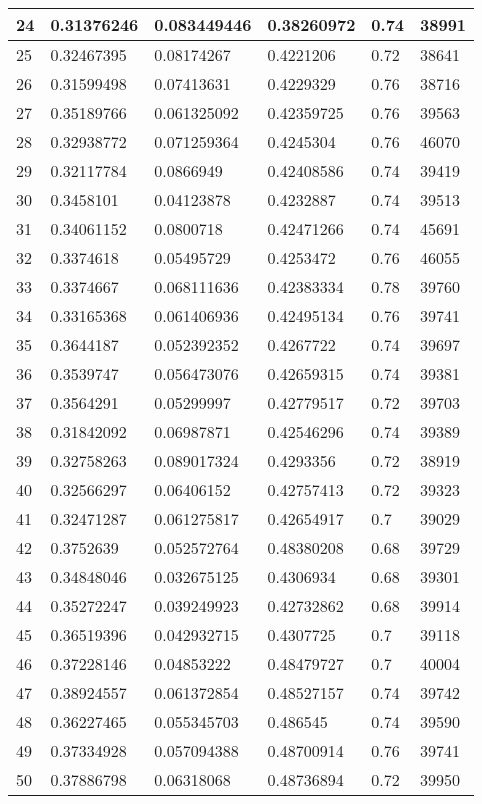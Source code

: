 \begin{longtable}{|l|l|l|l|l|l|}
24 & 0.31376246 & 0.083449446 & 0.38260972 & 0.74 & 38991 \\ \hline 
25 & 0.32467395 & 0.08174267 & 0.4221206 & 0.72 & 38641 \\ \hline 
26 & 0.31599498 & 0.07413631 & 0.4229329 & 0.76 & 38716 \\ \hline 
27 & 0.35189766 & 0.061325092 & 0.42359725 & 0.76 & 39563 \\ \hline 
28 & 0.32938772 & 0.071259364 & 0.4245304 & 0.76 & 46070 \\ \hline 
29 & 0.32117784 & 0.0866949 & 0.42408586 & 0.74 & 39419 \\ \hline 
30 & 0.3458101 & 0.04123878 & 0.4232887 & 0.74 & 39513 \\ \hline 
31 & 0.34061152 & 0.0800718 & 0.42471266 & 0.74 & 45691 \\ \hline 
32 & 0.3374618 & 0.05495729 & 0.4253472 & 0.76 & 46055 \\ \hline 
33 & 0.3374667 & 0.068111636 & 0.42383334 & 0.78 & 39760 \\ \hline 
34 & 0.33165368 & 0.061406936 & 0.42495134 & 0.76 & 39741 \\ \hline 
35 & 0.3644187 & 0.052392352 & 0.4267722 & 0.74 & 39697 \\ \hline 
36 & 0.3539747 & 0.056473076 & 0.42659315 & 0.74 & 39381 \\ \hline 
37 & 0.3564291 & 0.05299997 & 0.42779517 & 0.72 & 39703 \\ \hline 
38 & 0.31842092 & 0.06987871 & 0.42546296 & 0.74 & 39389 \\ \hline 
39 & 0.32758263 & 0.089017324 & 0.4293356 & 0.72 & 38919 \\ \hline 
40 & 0.32566297 & 0.06406152 & 0.42757413 & 0.72 & 39323 \\ \hline 
41 & 0.32471287 & 0.061275817 & 0.42654917 & 0.7 & 39029 \\ \hline 
42 & 0.3752639 & 0.052572764 & 0.48380208 & 0.68 & 39729 \\ \hline 
43 & 0.34848046 & 0.032675125 & 0.4306934 & 0.68 & 39301 \\ \hline 
44 & 0.35272247 & 0.039249923 & 0.42732862 & 0.68 & 39914 \\ \hline 
45 & 0.36519396 & 0.042932715 & 0.4307725 & 0.7 & 39118 \\ \hline 
46 & 0.37228146 & 0.04853222 & 0.48479727 & 0.7 & 40004 \\ \hline 
47 & 0.38924557 & 0.061372854 & 0.48527157 & 0.74 & 39742 \\ \hline 
48 & 0.36227465 & 0.055345703 & 0.486545 & 0.74 & 39590 \\ \hline 
49 & 0.37334928 & 0.057094388 & 0.48700914 & 0.76 & 39741 \\ \hline 
50 & 0.37886798 & 0.06318068 & 0.48736894 & 0.72 & 39950 \\ \hline 
\end{longtable}